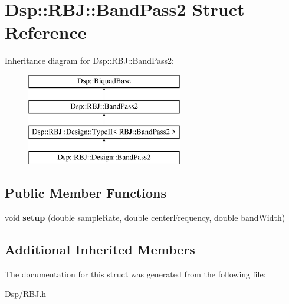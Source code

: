 \hypertarget{structDsp_1_1RBJ_1_1BandPass2}{\section{Dsp\-:\-:R\-B\-J\-:\-:Band\-Pass2 Struct Reference}
\label{structDsp_1_1RBJ_1_1BandPass2}
}
Inheritance diagram for Dsp\-:\-:R\-B\-J\-:\-:Band\-Pass2\-:\begin{figure}[H]
\begin{center}
\leavevmode
\includegraphics[height=4.000000cm]{structDsp_1_1RBJ_1_1BandPass2}
\end{center}
\end{figure}
\subsection*{Public Member Functions}
\begin{DoxyCompactItemize}
\item 
\hypertarget{structDsp_1_1RBJ_1_1BandPass2_ac10c8c1a01f2c0ed2dcc33eb69190bac}{void {\bfseries setup} (double sample\-Rate, double center\-Frequency, double band\-Width)}\label{structDsp_1_1RBJ_1_1BandPass2_ac10c8c1a01f2c0ed2dcc33eb69190bac}

\end{DoxyCompactItemize}
\subsection*{Additional Inherited Members}


The documentation for this struct was generated from the following file\-:\begin{DoxyCompactItemize}
\item 
Dsp/R\-B\-J.\-h\end{DoxyCompactItemize}
